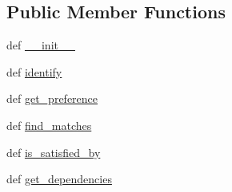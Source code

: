 \subsection*{Public Member Functions}
\begin{DoxyCompactItemize}
\item 
def \hyperlink{classpip_1_1__internal_1_1resolution_1_1resolvelib_1_1provider_1_1PipProvider_a7830436056aafdb8efc015d587fa9286}{\+\_\+\+\_\+init\+\_\+\+\_\+}
\item 
def \hyperlink{classpip_1_1__internal_1_1resolution_1_1resolvelib_1_1provider_1_1PipProvider_a290cb28fcc991c600d0011e5083bb9aa}{identify}
\item 
def \hyperlink{classpip_1_1__internal_1_1resolution_1_1resolvelib_1_1provider_1_1PipProvider_aad0c3f77c38814cf4e2b516be7092c42}{get\+\_\+preference}
\item 
def \hyperlink{classpip_1_1__internal_1_1resolution_1_1resolvelib_1_1provider_1_1PipProvider_adea10f5d507828e6833c9d83832c8e28}{find\+\_\+matches}
\item 
def \hyperlink{classpip_1_1__internal_1_1resolution_1_1resolvelib_1_1provider_1_1PipProvider_acc08d73432f5c5f883f3f831fab6033d}{is\+\_\+satisfied\+\_\+by}
\item 
def \hyperlink{classpip_1_1__internal_1_1resolution_1_1resolvelib_1_1provider_1_1PipProvider_afe9a0695a7a23d28ef8cf6bb90f9412a}{get\+\_\+dependencies}
\end{DoxyCompactItemize}
